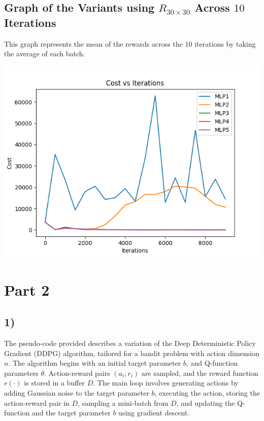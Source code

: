 \documentclass{article}
\begin{document}
\subsection*{Graph of the Variants using $R_{30\times30}$ Across $10$ Iterations}
This graph represents the mean of the rewards across the $10$ iterations by taking the average of each batch.
\begin{center}
    \includegraphics[scale=0.5]{RR/MLPcosts.png}
\end{center}


\section*{Part 2}
\subsection*{1)}

The pseudo-code provided describes a variation of the Deep Deterministic Policy Gradient (DDPG) algorithm, tailored for a bandit problem with action dimension \( n \). The algorithm begins with an initial target parameter \( b \), and Q-function parameters \( \theta \). Action-reward pairs \( (a_i, r_i) \) are sampled, and the reward function \( r(\cdot) \) is stored in a buffer \( D \). The main loop involves generating actions by adding Gaussian noise to the target parameter \( b \), executing the action, storing the action-reward pair in \( D \), sampling a mini-batch from \( D \), and updating the Q-function and the target parameter \( b \) using gradient descent.
\end{document}
